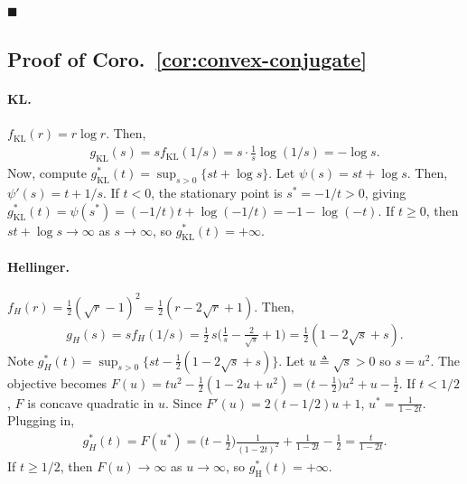     \hfill $\blacksquare$


\subsection*{Proof of Coro.~\ref{cor:convex-conjugate}}
\paragraph{KL.} $f_{\mathrm{KL}}(r)= r\log r$. Then, 
\begin{align}
    g_{\mathrm{KL}}(s)=s f_{\mathrm{KL}}(1/s)=s\cdot \frac1s\log(1/s)= -\log s.
\end{align}
Now, compute $g^{\ast}_{\mathrm{KL}}(t)=\sup_{s >0}\{st+\log s\}$. Let $\psi(s)=st+\log s$. Then, $\psi'(s)=t+1/s$. If $t < 0$, the stationary point is $s^{\ast} = -1/t > 0$, giving $g^*_{\mathrm{KL}}(t)=\psi(s^*)=(-1/t)t+\log(-1/t)=-1-\log(-t)$. If $t \geq 0$, then $st+\log s\to\infty$ as $s \rightarrow \infty$, so $g^*_{\mathrm{KL}}(t)=+\infty$. 

\paragraph{Hellinger.} $f_H(r)=\tfrac12(\sqrt r-1)^2=\tfrac12(r-2\sqrt r+1)$. Then, 
\begin{align}
    g_H(s)=s f_H(1/s) =\frac{1}{2}\,s\Big(\frac{1}{s}-\frac{2}{\sqrt s}+1\Big)
=\frac{1}{2}(1-2\sqrt{s}+s).
\end{align}
Note $g_H^*(t)=\sup_{s >0}\Big\{st-\tfrac12(1-2\sqrt s+s)\Big\}$. Let $u \triangleq \sqrt{s} > 0$ so $s = u^2$. The objective becomes $F(u)=t u^2-\tfrac12(1-2u+u^2)
=\Big(t-\tfrac12\Big)u^2+u-\tfrac12$. If $t < 1/2$, $F$ is concave quadratic in $u$. Since $F'(u) = 2(t-1/2)u + 1$, $u^{\ast} = \frac{1}{1-2t}$. Plugging in, 
\begin{align}
    g_H^*(t)=F(u^*)
=\Big(t-\tfrac12\Big)\frac{1}{(1-2t)^2}+\frac{1}{1-2t}-\frac12
=\frac{t}{1-2t}.
\end{align}
If $t \geq 1/2$, then $F(u) \rightarrow \infty$ as $u \rightarrow \infty$, so $g^{\ast}_{\mathrm{H}}(t) = +\infty$.


